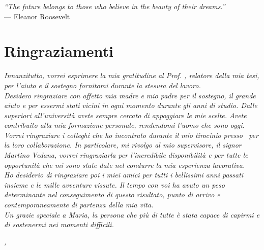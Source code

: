 
\cleardoublepage
{}
{}

\begin{flushright}{
	\slshape    
	``The future belongs to those who believe in the beauty of their dreams.''} \\ 
	\medskip
    --- Eleanor Roosevelt
\end{flushright}


\bigskip

\begingroup
\let\clearpage\relax
\let\cleardoublepage\relax
\let\cleardoublepage\relax

\chapter*{Ringraziamenti}

\noindent \textit{Innanzitutto, vorrei esprimere la mia gratitudine al Prof. \myProf, relatore della mia tesi, per l'aiuto e il sostegno fornitomi durante la stesura del lavoro.}\\

\noindent \textit{Desidero ringraziare con affetto mia madre e mio padre per il sostegno, il grande aiuto e per essermi stati vicini in ogni momento durante gli anni di studio. Dalle superiori all'università avete sempre cercato di appoggiare le mie scelte. Avete contribuito alla mia formazione personale, rendendomi l'uomo che sono oggi.}\\

\noindent \textit{Vorrei ringraziare i colleghi che ho incontrato durante il mio tirocinio presso \azienda\ per la loro collaborazione. In particolare, mi rivolgo al mio supervisore, il signor Martino Vedana, vorrei ringraziarla per l'incredibile disponibilità e per tutte le opportunità che mi sono state date nel condurre la mia esperienza lavorativa.}\\

\noindent \textit{Ho desiderio di ringraziare poi i miei amici per tutti i bellissimi anni passati insieme e le mille avventure vissute. Il tempo con voi ha avuto un peso determinante nel conseguimento di questo risultato, punto di arrivo e contemporaneamente di partenza della mia vita.}\\

\noindent \textit{Un grazie speciale a Maria, la persona che più di tutte è stata capace di capirmi e di sostenermi nei momenti difficili.}\\

\bigskip

\noindent\textit{\myLocation, \myTime}
\hfill \myName

\endgroup

